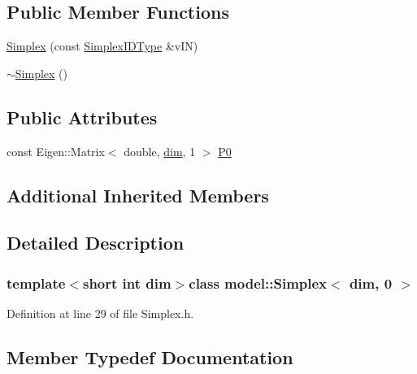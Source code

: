 \subsection*{Public Member Functions}
\begin{DoxyCompactItemize}
\item 
\hyperlink{classmodel_1_1_simplex_3_01dim_00_010_01_4_a51dc20bd6a626566939c004d208bde01}{Simplex} (const \hyperlink{classmodel_1_1_simplex_3_01dim_00_010_01_4_a83643730c831942341d6e5117a9d59d7}{Simplex\+I\+D\+Type} \&v\+I\+N)
\item 
\hyperlink{classmodel_1_1_simplex_3_01dim_00_010_01_4_a251796a74a8260f619225f4c5c30d009}{$\sim$\+Simplex} ()
\end{DoxyCompactItemize}
\subsection*{Public Attributes}
\begin{DoxyCompactItemize}
\item 
const Eigen\+::\+Matrix$<$ double, \hyperlink{plot_nd_a_8m_a382f3ca768b275b8d563604f7fc7df73}{dim}, 1 $>$ \hyperlink{classmodel_1_1_simplex_3_01dim_00_010_01_4_ad6cd6c3e05d9f3fd3abfddba8b48c699}{P0}
\end{DoxyCompactItemize}
\subsection*{Additional Inherited Members}


\subsection{Detailed Description}
\subsubsection*{template$<$short int dim$>$class model\+::\+Simplex$<$ dim, 0 $>$}



Definition at line 29 of file Simplex.\+h.



\subsection{Member Typedef Documentation}
\hypertarget{classmodel_1_1_simplex_3_01dim_00_010_01_4_a83643730c831942341d6e5117a9d59d7}{}
